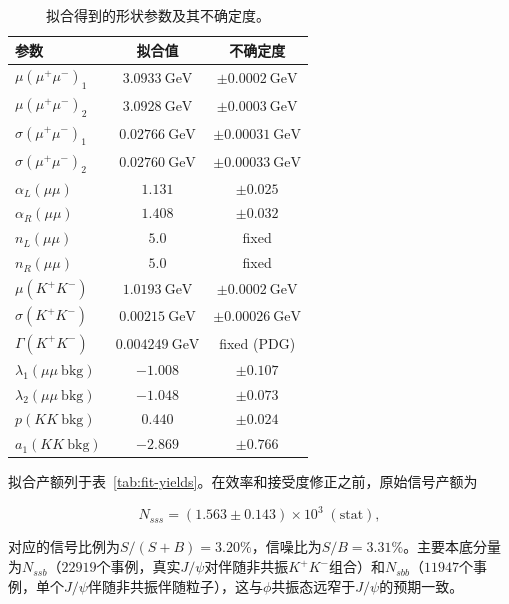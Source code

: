 \begin{table}[htbp]
  \centering
  \caption{拟合得到的形状参数及其不确定度。}
  \label{tab:fit-shape-params}
  \small
  \begin{tabular}{lcc}
    \toprule
    参数 & 拟合值 & 不确定度 \\
    \midrule
    $\mu(\mu^+\mu^-)_1$ & $\SI{3.0933}{\giga\eV}$ & $\pm \SI{0.0002}{\giga\eV}$ \\
    $\mu(\mu^+\mu^-)_2$ & $\SI{3.0928}{\giga\eV}$ & $\pm \SI{0.0003}{\giga\eV}$ \\
    $\sigma(\mu^+\mu^-)_1$ & $\SI{0.02766}{\giga\eV}$ & $\pm \SI{0.00031}{\giga\eV}$ \\
    $\sigma(\mu^+\mu^-)_2$ & $\SI{0.02760}{\giga\eV}$ & $\pm \SI{0.00033}{\giga\eV}$ \\
    $\alpha_L(\mu\mu)$ & $1.131$ & $\pm 0.025$ \\
    $\alpha_R(\mu\mu)$ & $1.408$ & $\pm 0.032$ \\
    $n_L(\mu\mu)$ & $5.0$ & fixed \\
    $n_R(\mu\mu)$ & $5.0$ & fixed \\
    $\mu(K^+K^-)$ & $\SI{1.0193}{\giga\eV}$ & $\pm \SI{0.0002}{\giga\eV}$ \\
    $\sigma(K^+K^-)$ & $\SI{0.00215}{\giga\eV}$ & $\pm \SI{0.00026}{\giga\eV}$ \\
    $\Gamma(K^+K^-)$ & $\SI{0.004249}{\giga\eV}$ & fixed (PDG) \\
    $\lambda_1(\mu\mu\ \mathrm{bkg})$ & $-1.008$ & $\pm 0.107$ \\
    $\lambda_2(\mu\mu\ \mathrm{bkg})$ & $-1.048$ & $\pm 0.073$ \\
    $p(KK\ \mathrm{bkg})$ & $0.440$ & $\pm 0.024$ \\
    $a_1(KK\ \mathrm{bkg})$ & $-2.869$ & $\pm 0.766$ \\
    \bottomrule
  \end{tabular}
\end{table}

拟合产额列于表~\ref{tab:fit-yields}。在效率和接受度修正之前，原始信号产额为

\begin{equation}
\label{eq:raw-yield}
N_{sss} = (1.563 \pm 0.143)\times10^3\;(\mathrm{stat}),
\end{equation}

对应的信号比例为$S/(S+B) = 3.20\%$，信噪比为$S/B = 3.31\%$。主要本底分量为$N_{ssb}$（$22919$个事例，真实$J/\psi$对伴随非共振$K^+K^-$组合）和$N_{sbb}$（$11947$个事例，单个$J/\psi$伴随非共振伴随粒子），这与$\phi$共振态远窄于$J/\psi$的预期一致。

